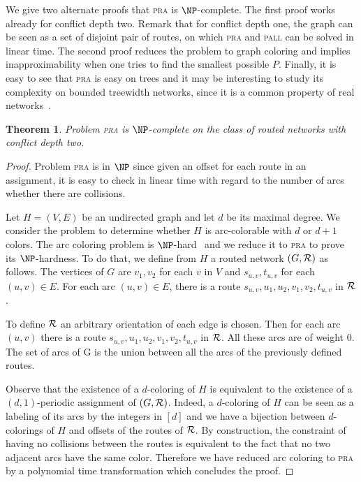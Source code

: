 \documentclass[10pt, conference, letterpaper]{IEEEtran}
\newtheorem{theorem}{Theorem}
\newcommand\pall{\textsc{pall}\xspace}
\newcommand\pra{\textsc{pra}\xspace}
\begin{document}
We give two alternate proofs that \pra is $\NP$-complete.
The first proof works already for conflict depth two. Remark that for conflict depth one,
the graph can be seen as a set of disjoint pair of routes, on which \pra and \pall can be solved in linear time. 
 The second proof reduces the problem to graph coloring and implies inapproximability when one tries to find the smallest possible $P$.  Finally, it is easy to see that \pra is easy on trees and it may be interesting to study its complexity on 
 bounded treewidth networks, since it is a common property of real networks~\cite{de2011treewidth}.
 

 \begin{theorem}
Problem \pra is $\NP$-complete on the class of routed networks with conflict depth two.
\end{theorem}
 \begin{proof}
 Problem \pra is in $\NP$ since given an offset for each route in an assignment, it is easy to check in linear time with regard to the number of arcs whether there are collisions.
 
  Let $H=(V,E)$ be an undirected graph and let $d$ be its maximal degree. We consider the problem to determine whether $H$ is arc-colorable  with $d$ or $d+1$ colors. The arc coloring problem is $\NP$-hard~\cite{holyer1981np} and we reduce it to \pra to prove its $\NP$-hardness. To do that, we define from $H$ a routed network $(G,{\cal R})$ as follows.
  The vertices of $G$ are $v_1, v_2$ for each $v$ in $V$ and $s_{u,v}, t_{u,v}$ for each $(u,v) \in E$.
  For each arc $(u,v) \in E$, there is a route $s_{u,v},u_1,u_2,v_1,v_2,t_{u,v}$ in ${\cal R}$. 
  
   To define ${\cal R}$ an arbitrary orientation of each edge is chosen. 
   Then for each arc $(u,v)$ there is a route $s_{u,v},u_1,u_2,v_1,v_2,t_{u,v}$ in ${\cal R}$.
  All these arcs are of weight $0$. The set of arcs of G is the union between all the arcs of the previously defined routes.
   
  Observe that the existence of a $d$-coloring of $H$ is equivalent to the existence of a $(d,1)$-periodic assignment
  of $(G,{\cal R})$. Indeed, a $d$-coloring of $H$ can be seen as a labeling of its arcs by the integers
  in $[d]$ and we have a bijection between $d$-colorings of $H$ and offsets of the routes of ${\cal R}$.
  By construction, the constraint of having no collisions between the routes is equivalent to the fact that no two adjacent arcs have the same color. Therefore we have reduced arc coloring to \pra by a polynomial time transformation which concludes the proof. 
 \end{proof}
 
\end{document}
